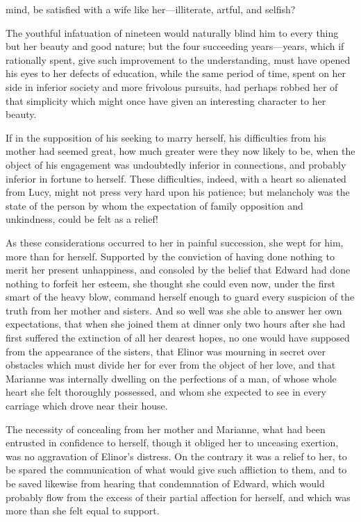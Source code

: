 mind, be satisfied with a wife like her---illiterate, artful, and selfish?

The youthful infatuation of nineteen would naturally blind him to every thing but her beauty and good nature; but the four succeeding years---years, which if rationally spent, give such improvement to the understanding, must have opened his eyes to her defects of education, while the same period of time, spent on her side in inferior society and more frivolous pursuits, had perhaps robbed her of that simplicity which might once have given an interesting character to her beauty.

If in the supposition of his seeking to marry herself, his difficulties from his mother had seemed great, how much greater were they now likely to be, when the object of his engagement was undoubtedly inferior in connections, and probably inferior in fortune to herself. These difficulties, indeed, with a heart so alienated from Lucy, might not press very hard upon his patience; but melancholy was the state of the person by whom the expectation of family opposition and unkindness, could be felt as a relief!

As these considerations occurred to her in painful succession, she wept for him, more than for herself. Supported by the conviction of having done nothing to merit her present unhappiness, and consoled by the belief that Edward had done nothing to forfeit her esteem, she thought she could even now, under the first smart of the heavy blow, command herself enough to guard every suspicion of the truth from her mother and sisters. And so well was she able to answer her own expectations, that when she joined them at dinner only two hours after she had first suffered the extinction of all her dearest hopes, no one would have supposed from the appearance of the sisters, that Elinor was mourning in secret over obstacles which must divide her for ever from the object of her love, and that Marianne was internally dwelling on the perfections of a man, of whose whole heart she felt thoroughly possessed, and whom she expected to see in every carriage which drove near their house.

The necessity of concealing from her mother and Marianne, what had been entrusted in confidence to herself, though it obliged her to unceasing exertion, was no aggravation of Elinor's distress. On the contrary it was a relief to her, to be spared the communication of what would give such affliction to them, and to be saved likewise from hearing that condemnation of Edward, which would probably flow from the excess of their partial affection for herself, and which was more than she felt equal to support.

